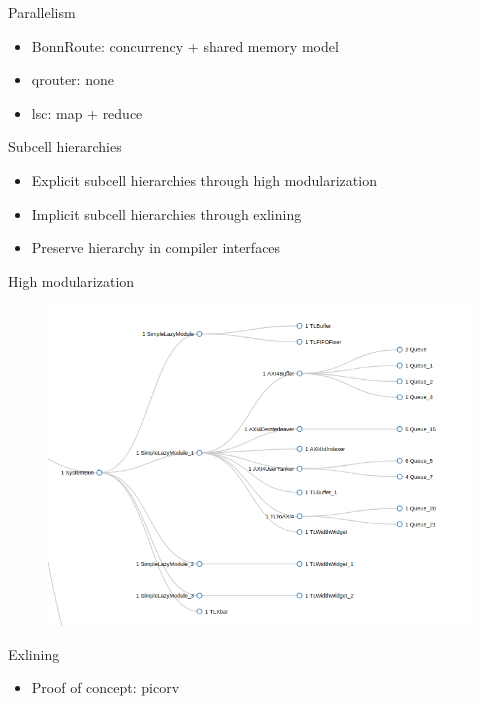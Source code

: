 \documentclass[9pt]{beamer}
\begin{document}
\begin{frame}{Parallelism}
	\begin{itemize}
        \setlength\itemsep{1em}
		\item BonnRoute: concurrency + shared memory model
		\item qrouter: none 
		\item lsc: map + reduce
	\end{itemize}
\end{frame}

\begin{frame}{Subcell hierarchies}
	\begin{itemize}
        \setlength\itemsep{1em}
		\item Explicit subcell hierarchies through high modularization
		\item Implicit subcell hierarchies through exlining
		\item Preserve hierarchy in compiler interfaces
	\end{itemize}
\end{frame}

\begin{frame}{High modularization}
       \begin{figure}
        \centering
        \includegraphics[scale=0.38]{SystemBus.png}
       \end{figure}
\end{frame}

\begin{frame}{Exlining}
	\begin{itemize}
        \setlength\itemsep{1em}
		\item Proof of concept: picorv
	\end{itemize}
\end{frame}
\end{document}
